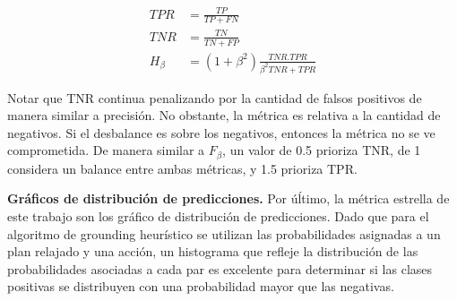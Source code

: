 \begin{align}
    TPR &= \frac{TP}{TP + FN} \\
    TNR &= \frac{TN}{TN + FP} \\
    H_{\beta} &= (1 + \beta^2) \frac{TNR . TPR}{\beta^2 TNR + TPR}
\end{align}

Notar que TNR continua penalizando por la cantidad de falsos positivos de manera
similar a precisión. No obstante, la métrica es relativa a la cantidad de
negativos. Si el desbalance es sobre los negativos, entonces la métrica no se ve
comprometida. De manera similar a $F_{\beta}$, un valor de 0.5 prioriza TNR, de
1 considera un balance entre ambas métricas, y 1.5 prioriza TPR.

\textbf{Gráficos de distribución de predicciones.} Por úĺtimo, la métrica
estrella de este trabajo son los gráfico de distribución de predicciones. Dado
que para el algoritmo de grounding heurístico se utilizan las probabilidades
asignadas a un plan relajado y una acción, un histograma que refleje la
distribución de las probabilidades asociadas a cada par es excelente para
determinar si las clases positivas se distribuyen con una probabilidad mayor que
las negativas.